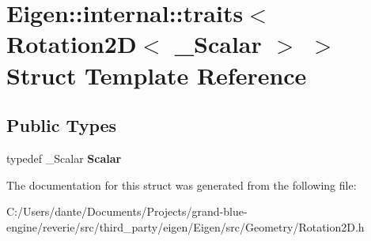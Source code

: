 \hypertarget{struct_eigen_1_1internal_1_1traits_3_01_rotation2_d_3_01___scalar_01_4_01_4}{}\section{Eigen\+::internal\+::traits$<$ Rotation2D$<$ \+\_\+\+Scalar $>$ $>$ Struct Template Reference}
\label{struct_eigen_1_1internal_1_1traits_3_01_rotation2_d_3_01___scalar_01_4_01_4}
\subsection*{Public Types}
\begin{DoxyCompactItemize}
\item 
\mbox{\label{struct_eigen_1_1internal_1_1traits_3_01_rotation2_d_3_01___scalar_01_4_01_4_af8b1ac65b4bce2a1152f5c0d2d0e981b}} 
typedef \+\_\+\+Scalar {\bfseries Scalar}
\end{DoxyCompactItemize}


The documentation for this struct was generated from the following file\+:\begin{DoxyCompactItemize}
\item 
C\+:/\+Users/dante/\+Documents/\+Projects/grand-\/blue-\/engine/reverie/src/third\+\_\+party/eigen/\+Eigen/src/\+Geometry/Rotation2\+D.\+h\end{DoxyCompactItemize}
